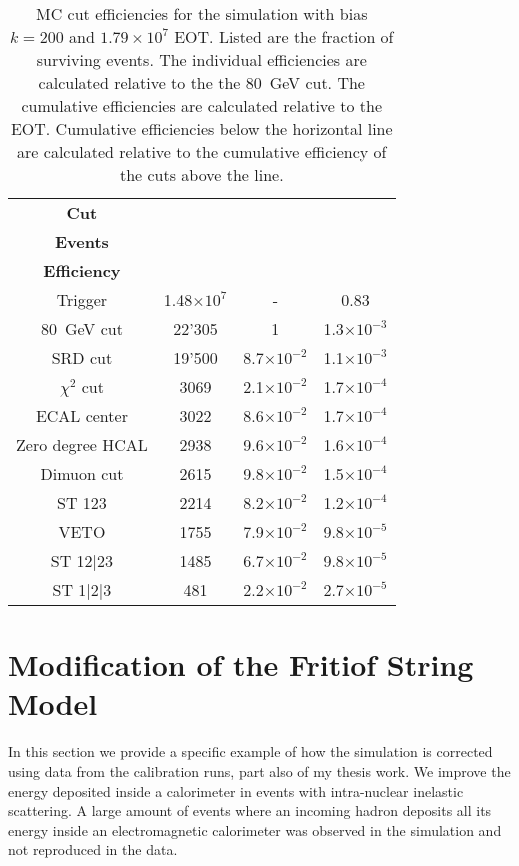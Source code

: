 \begin{table}[htbp]
	\centering
	\caption[MC cut efficiencies for the simulation with bias $k=200$ and $1.79\times10^7$ EOT.]{MC cut efficiencies for the simulation with bias $k=200$ and $1.79\times10^7$ EOT. Listed are the fraction of surviving events. The individual efficiencies are calculated relative to the the 80~GeV cut. The cumulative efficiencies are calculated relative to the EOT. Cumulative efficiencies below the horizontal line are calculated relative to the cumulative efficiency of the cuts above the line.}
	\begin{tabular}{|cccc|}
		\toprule
		\textbf{Cut} & \thead{\textbf{Surviving}\\\textbf{Events}} & \thead{\textbf{Efficiency}}& \thead{\textbf{Cumulative}\\\textbf{Efficiency}}\\
		\midrule
		Trigger & 1.48$\times10^{7}$ & - & 0.83\\ 
		80~GeV cut & 22'305 & 1 & 1.3$\times 10^{-3}$\\
		SRD cut & 19'500 & 8.7$\times 10^{-2}$ & 1.1$\times 10^{-3}$\\
		$\chi^2$ cut & 3069 & 2.1$\times 10^{-2}$ & 1.7$\times 10^{-4}$\\
		ECAL center & 3022 & 8.6$\times 10^{-2}$ & 1.7$\times 10^{-4}$\\
		Zero degree HCAL & 2938 & 9.6$\times 10^{-2}$ & 1.6$\times 10^{-4}$\\
		Dimuon cut & 2615 & 9.8$\times 10^{-2}$ & 1.5$\times 10^{-4}$\\
		\midrule
		ST 123 & 2214 & 8.2$\times 10^{-2}$ & 1.2$\times 10^{-4}$\\
		VETO & 1755 & 7.9$\times 10^{-2}$ & 9.8$\times 10^{-5}$\\
		ST 12|23 & 1485 & 6.7$\times 10^{-2}$ & 9.8$\times 10^{-5}$\\
		ST 1|2|3 & 481 & 2.2$\times 10^{-2}$ & 2.7$\times 10^{-5}$\\
		\bottomrule
	\end{tabular}
	\label{res:Tab:mccuts}
      \end{table}

\FloatBarrier\noindent
\section{Modification of the Fritiof String Model}
\label{appC:sec:ftfp-modifications}

In this section we provide a specific example of how the simulation is corrected using data from the calibration runs, part also of my thesis work. We improve the energy deposited inside a calorimeter in events with intra-nuclear inelastic scattering. A large amount of events where an incoming hadron deposits all its energy inside an electromagnetic calorimeter was observed in the simulation and not reproduced in the data.

